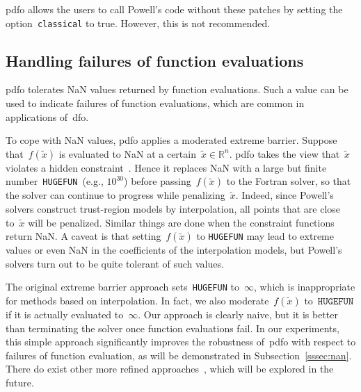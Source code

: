 \documentclass[
    smallextended,  %
    final,          %
]{svjour3}
\newcommand{\R}{\mathbb{R}}
\newcommand{\obj}{f}
\newcommand{\hugefun}{\texttt{HUGEFUN}\xspace}
\begin{document}
\gls{pdfo} allows the users to call Powell's code without these patches by setting the
option~\texttt{classical} to true. However, this is not recommended.


\subsection{Handling failures of function evaluations}
\label{ssec:barrier}

\gls{pdfo} tolerates NaN values returned by function evaluations. Such a value can be used to
indicate failures of function evaluations, which are common in applications of~\gls{dfo}.

To cope with NaN values, \gls{pdfo} applies a moderated extreme barrier.
Suppose that~$\obj(\tilde{x})$ is evaluated to NaN at a certain~$\tilde{x}\in\R^n$.
\gls{pdfo} takes the view that~$\tilde{x}$ violates a hidden
constraint~\mbox{\cite{LeDigabel_Wild_2015,Audet_Caporossi_Jacquet_2020}}.
Hence it replaces NaN with a large but finite number~\hugefun~(e.g., $10^{30}$)
before passing~$\obj(\tilde{x})$ to the Fortran solver, so that the solver can continue to progress while
penalizing~$\tilde{x}$. Indeed, since Powell's solvers construct trust-region models by interpolation,
all points that are close to~$\tilde{x}$ will be penalized.
Similar things are done when the constraint functions return NaN.
A caveat is that setting~$\obj(\tilde{x})$ to \hugefun may lead to
extreme values or even NaN in the coefficients of the interpolation models, but Powell's solvers
turn out to be quite tolerant of such values.

The original extreme barrier approach sets~\hugefun to~$\infty$, which is inappropriate for
methods based on interpolation. In fact, we also moderate~$\obj(\tilde{x})$ to~$\hugefun$ if it is
actually evaluated to~$\infty$.
Our approach is clearly naive, but it is better than terminating the solver once function
evaluations fail. In our experiments, this simple approach significantly improves the robustness
of~\gls{pdfo} with respect to failures of function evaluation, as will be demonstrated in Subsection~\ref{sssec:nan}.
There do exist other more refined approaches~\cite{Audet_Caporossi_Jacquet_2020},
which will be explored in the future.
\end{document}
